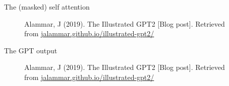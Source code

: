 \documentclass[10pt]{beamer}
\begin{document}
\begin{frame}{The (masked) self attention}
\begin{figure}[h]

\caption{Alammar, J (2019). The Illustrated GPT2 [Blog post]. Retrieved from \href{https://jalammar.github.io/illustrated-gpt2/}{jalammar.github.io/illustrated-gpt2/}
}
\end{figure}

\end{frame}


\begin{frame}{The GPT output}

\begin{figure}[h]
\centering
{}
\caption{Alammar, J (2019). The Illustrated GPT2 [Blog post]. Retrieved from \href{https://jalammar.github.io/illustrated-gpt2/}{jalammar.github.io/illustrated-gpt2/}
}
\end{figure}

\end{frame}
\end{document}
